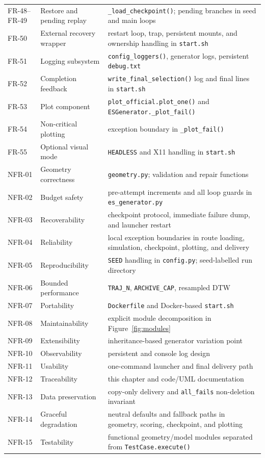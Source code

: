 \documentclass[11pt,a4paper,openany]{report}
\newcommand{\code}[1]{\texttt{#1}}
\begin{document}
\begin{longtable}{L{2.3cm} L{4.2cm} L{7.7cm}}
FR-48--FR-49 & Restore and pending replay & \code{\_load\_checkpoint()}; pending branches in seed and main loops\\
FR-50 & External recovery wrapper & restart loop, trap, persistent mounts, and ownership handling in \code{start.sh}\\
FR-51 & Logging subsystem & \code{config\_loggers()}, generator logs, persistent \code{debug.txt}\\
FR-52 & Completion feedback & \code{write\_final\_selection()} log and final lines in \code{start.sh}\\
FR-53 & Plot component & \code{plot\_official.plot\_one()} and \code{ESGenerator.\_plot\_fail()}\\
FR-54 & Non-critical plotting & exception boundary in \code{\_plot\_fail()}\\
FR-55 & Optional visual mode & \code{HEADLESS} and X11 handling in \code{start.sh}\\
NFR-01 & Geometry correctness & \code{geometry.py}; validation and repair functions\\
NFR-02 & Budget safety & pre-attempt increments and all loop guards in \code{es\_generator.py}\\
NFR-03 & Recoverability & checkpoint protocol, immediate failure dump, and launcher restart\\
NFR-04 & Reliability & local exception boundaries in route loading, simulation, checkpoint, plotting, and delivery\\
NFR-05 & Reproducibility & \code{SEED} handling in \code{config.py}; seed-labelled run directory\\
NFR-06 & Bounded performance & \code{TRAJ\_N}, \code{ARCHIVE\_CAP}, resampled DTW\\
NFR-07 & Portability & \code{Dockerfile} and Docker-based \code{start.sh}\\
NFR-08 & Maintainability & explicit module decomposition in Figure~\ref{fig:modules}\\
NFR-09 & Extensibility & inheritance-based generator variation point\\
NFR-10 & Observability & persistent and console log design\\
NFR-11 & Usability & one-command launcher and final delivery path\\
NFR-12 & Traceability & this chapter and code/UML documentation\\
NFR-13 & Data preservation & copy-only delivery and \code{all\_fails} non-deletion invariant\\
NFR-14 & Graceful degradation & neutral defaults and fallback paths in geometry, scoring, checkpoint, and plotting\\
NFR-15 & Testability & functional geometry/model modules separated from \code{TestCase.execute()}\\
\bottomrule
\end{longtable}
\normalsize
\end{document}
